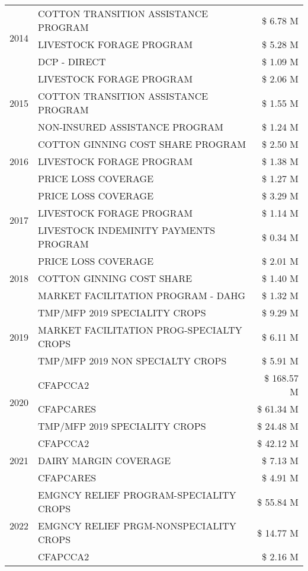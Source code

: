 \begin{tabular}{llr}
\cline{1-3}
\multirow[t]{3}{*}{2014} & COTTON TRANSITION ASSISTANCE PROGRAM & \$ 6.78 M \\
 & LIVESTOCK FORAGE PROGRAM & \$ 5.28 M \\
 & DCP - DIRECT & \$ 1.09 M \\
\cline{1-3}
\multirow[t]{3}{*}{2015} & LIVESTOCK FORAGE PROGRAM & \$ 2.06 M \\
 & COTTON TRANSITION ASSISTANCE PROGRAM & \$ 1.55 M \\
 & NON-INSURED ASSISTANCE PROGRAM & \$ 1.24 M \\
\cline{1-3}
\multirow[t]{3}{*}{2016} & COTTON GINNING COST SHARE PROGRAM & \$ 2.50 M \\
 & LIVESTOCK FORAGE PROGRAM & \$ 1.38 M \\
 & PRICE LOSS COVERAGE & \$ 1.27 M \\
\cline{1-3}
\multirow[t]{3}{*}{2017} & PRICE LOSS COVERAGE & \$ 3.29 M \\
 & LIVESTOCK FORAGE PROGRAM & \$ 1.14 M \\
 & LIVESTOCK INDEMINITY PAYMENTS PROGRAM & \$ 0.34 M \\
\cline{1-3}
\multirow[t]{3}{*}{2018} & PRICE LOSS COVERAGE & \$ 2.01 M \\
 & COTTON GINNING COST SHARE & \$ 1.40 M \\
 & MARKET FACILITATION PROGRAM - DAHG & \$ 1.32 M \\
\cline{1-3}
\multirow[t]{3}{*}{2019} & TMP/MFP 2019 SPECIALITY CROPS & \$ 9.29 M \\
 & MARKET FACILITATION PROG-SPECIALTY CROPS & \$ 6.11 M \\
 & TMP/MFP 2019 NON SPECIALTY CROPS & \$ 5.91 M \\
\cline{1-3}
\multirow[t]{3}{*}{2020} & CFAPCCA2 & \$ 168.57 M \\
 & CFAPCARES & \$ 61.34 M \\
 & TMP/MFP 2019 SPECIALITY CROPS & \$ 24.48 M \\
\cline{1-3}
\multirow[t]{3}{*}{2021} & CFAPCCA2 & \$ 42.12 M \\
 & DAIRY MARGIN COVERAGE & \$ 7.13 M \\
 & CFAPCARES & \$ 4.91 M \\
\cline{1-3}
\multirow[t]{3}{*}{2022} & EMGNCY RELIEF PROGRAM-SPECIALITY CROPS & \$ 55.84 M \\
 & EMGNCY RELIEF PRGM-NONSPECIALITY CROPS & \$ 14.77 M \\
 & CFAPCCA2 & \$ 2.16 M \\
\cline{1-3}
\bottomrule
\end{tabular}
